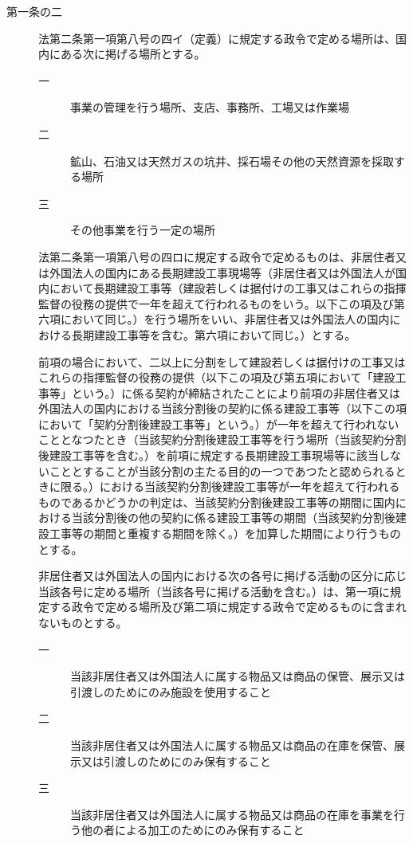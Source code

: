 \documentclass[twocolumn,a4j,10pt]{ltjtarticle}
\begin{document}
\begin{description}
\item[第一条の二]法第二条第一項第八号の四イ（定義）に規定する政令で定める場所は、国内にある次に掲げる場所とする。
\begin{description}
\item[一]事業の管理を行う場所、支店、事務所、工場又は作業場
\item[二]鉱山、石油又は天然ガスの坑井、採石場その他の天然資源を採取する場所
\item[三]その他事業を行う一定の場所
\end{description}
\item[]法第二条第一項第八号の四ロに規定する政令で定めるものは、非居住者又は外国法人の国内にある長期建設工事現場等（非居住者又は外国法人が国内において長期建設工事等（建設若しくは据付けの工事又はこれらの指揮監督の役務の提供で一年を超えて行われるものをいう。以下この項及び第六項において同じ。）を行う場所をいい、非居住者又は外国法人の国内における長期建設工事等を含む。第六項において同じ。）とする。
\item[]前項の場合において、二以上に分割をして建設若しくは据付けの工事又はこれらの指揮監督の役務の提供（以下この項及び第五項において「建設工事等」という。）に係る契約が締結されたことにより前項の非居住者又は外国法人の国内における当該分割後の契約に係る建設工事等（以下この項において「契約分割後建設工事等」という。）が一年を超えて行われないこととなつたとき（当該契約分割後建設工事等を行う場所（当該契約分割後建設工事等を含む。）を前項に規定する長期建設工事現場等に該当しないこととすることが当該分割の主たる目的の一つであつたと認められるときに限る。）における当該契約分割後建設工事等が一年を超えて行われるものであるかどうかの判定は、当該契約分割後建設工事等の期間に国内における当該分割後の他の契約に係る建設工事等の期間（当該契約分割後建設工事等の期間と重複する期間を除く。）を加算した期間により行うものとする。
\item[]非居住者又は外国法人の国内における次の各号に掲げる活動の区分に応じ当該各号に定める場所（当該各号に掲げる活動を含む。）は、第一項に規定する政令で定める場所及び第二項に規定する政令で定めるものに含まれないものとする。
\begin{description}
\item[一]当該非居住者又は外国法人に属する物品又は商品の保管、展示又は引渡しのためにのみ施設を使用すること
\item[二]当該非居住者又は外国法人に属する物品又は商品の在庫を保管、展示又は引渡しのためにのみ保有すること
\item[三]当該非居住者又は外国法人に属する物品又は商品の在庫を事業を行う他の者による加工のためにのみ保有すること

\end{description}
\end{description}
\end{document}
